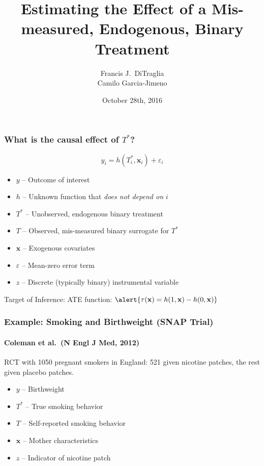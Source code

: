 \documentclass{beamer}
\title[Binary Regressors]{Estimating the Effect of a Mis-measured, Endogenous, Binary Treatment}
\author[FJ DiTraglia]{Francis J.\ DiTraglia\\ Camilo Garcia-Jimeno}
\institute{University of Pennsylvania}
\date{October 28th, 2016}
\begin{document}
 

\begin{frame}[plain]
	\titlepage 
\end{frame} 
\begin{frame}
  \frametitle{What is the causal effect of $T^*$?}
  \vspace{-1em}
  \[ y_i = h(T^*_i, \mathbf{x}_i) + \varepsilon_i\]
  \vspace{-1.5em}
  \begin{itemize}
    \item $y$ -- Outcome of interest
    \item $h$ -- Unknown function that \emph{does not depend on} $i$
    \item $T^*$ -- Unobserved, endogenous binary treatment
    \item $T$ -- Observed, mis-measured binary surrogate for $T^*$
    \item $\mathbf{x}$ -- Exogenous covariates
    \item $\varepsilon$ -- Mean-zero error term
    \item $z$ -- Discrete (typically binary) instrumental variable
  \end{itemize}

 \begin{block}{Target of Inference:}
   ATE function:  $\alert{\tau(\mathbf{x}) = h(1,\mathbf{x}) - h(0,\mathbf{x})}$
  \end{block}
\end{frame}
\begin{frame}
  \frametitle{Example: Smoking and Birthweight (SNAP Trial)}
\framesubtitle{Coleman et al.\ (N Engl J Med, 2012)}
  RCT with 1050 pregnant smokers in England: 521 given nicotine patches, the rest given placebo patches.
\begin{itemize}
  \item $y$ -- Birthweight 
  \item $T^*$ -- True smoking behavior 
  \item $T$ -- Self-reported smoking behavior
  \item $\mathbf{x}$ -- Mother characteristics
  \item $z$ -- Indicator of nicotine patch
\end{itemize}
   
\end{frame}
\end{document}
